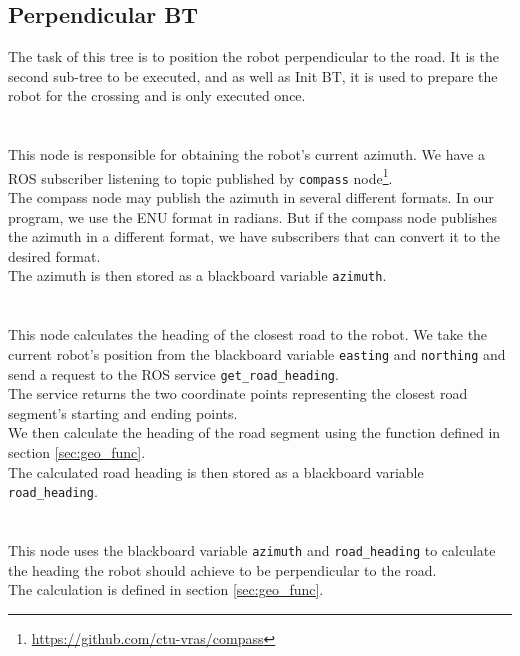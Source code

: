 \subsection{Perpendicular BT}
\label{sec:Perpendicular-BT-impl}
    The task of this tree is to position the robot perpendicular to the road. It is the second sub-tree to be executed, and as well as Init BT, it is used to prepare the robot for the crossing and is only executed once.\\\\
    \\
        This node is responsible for obtaining the robot's current azimuth. We have a ROS subscriber listening to topic published by \texttt{compass} node\footnote{\url{https://github.com/ctu-vras/compass}}.\\
        The compass node may publish the azimuth in several different formats. In our program, we use the ENU format in radians. But if the compass node publishes the azimuth in a different format, we have subscribers that can convert it to the desired format.\\
        The azimuth is then stored as a blackboard variable \texttt{azimuth}.\\\\
    \\
        This node calculates the heading of the closest road to the robot. We take the current robot's position from the blackboard variable \texttt{easting} and \texttt{northing} and send a request to the ROS service \texttt{get\_road\_heading}.\\
        The service returns the two coordinate points representing the closest road segment's starting and ending points.\\
        We then calculate the heading of the road segment using the function defined in section \ref{sec:geo_func}.\\
        The calculated road heading is then stored as a blackboard variable \texttt{road\_heading}.\\\\
    \\
        This node uses the blackboard variable \texttt{azimuth} and \texttt{road\_heading} to calculate the heading the robot should achieve to be perpendicular to the road.\\
        The calculation is defined in section \ref{sec:geo_func}.\\

